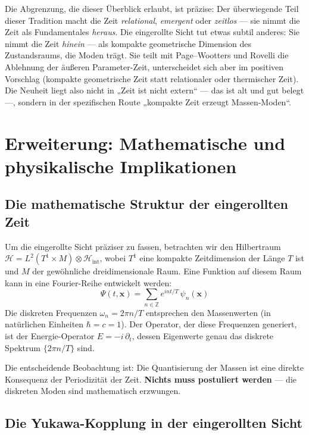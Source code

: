 \documentclass[11pt,a4paper]{article}
\begin{document}
Die Abgrenzung, die dieser Überblick erlaubt, ist präzise: Der überwiegende Teil dieser Tradition macht die Zeit \emph{relational}, \emph{emergent} oder \emph{zeitlos} --- sie nimmt die Zeit als Fundamentales \emph{heraus}. Die eingerollte Sicht tut etwas subtil anderes: Sie nimmt die Zeit \emph{hinein} --- als kompakte geometrische Dimension des Zustandsraums, die Moden trägt. Sie teilt mit Page--Wootters und Rovelli die Ablehnung der äußeren Parameter-Zeit, unterscheidet sich aber im positiven Vorschlag (kompakte geometrische Zeit statt relationaler oder thermischer Zeit). Die Neuheit liegt also nicht in „Zeit ist nicht extern`` --- das ist alt und gut belegt ---, sondern in der spezifischen Route „kompakte Zeit erzeugt Massen-Moden``.

\section{Erweiterung: Mathematische und physikalische Implikationen}

\subsection{Die mathematische Struktur der eingerollten Zeit}

Um die eingerollte Sicht präziser zu fassen, betrachten wir den Hilbertraum $\mathcal{H} = L^2(T^1 \times M) \otimes \mathcal{H}_{\text{int}}$, wobei $T^1$ eine kompakte Zeitdimension der Länge $T$ ist und $M$ der gewöhnliche dreidimensionale Raum. Eine Funktion auf diesem Raum kann in eine Fourier-Reihe entwickelt werden:
\[
  \Psi(t, \mathbf{x}) = \sum_{n \in \mathbb{Z}} e^{i n t / T}\, \psi_n(\mathbf{x})
\]
Die diskreten Frequenzen $\omega_n = 2\pi n / T$ entsprechen den Massenwerten (in natürlichen Einheiten $\hbar = c = 1$). Der Operator, der diese Frequenzen generiert, ist der Energie-Operator $\hat{E} = -i\,\partial_t$, dessen Eigenwerte genau das diskrete Spektrum $\{2\pi n / T\}$ sind.

Die entscheidende Beobachtung ist: Die Quantisierung der Massen ist eine direkte Konsequenz der Periodizität der Zeit. \textbf{Nichts muss postuliert werden} --- die diskreten Moden sind mathematisch erzwungen.

\subsection{Die Yukawa-Kopplung in der eingerollten Sicht}
\end{document}
